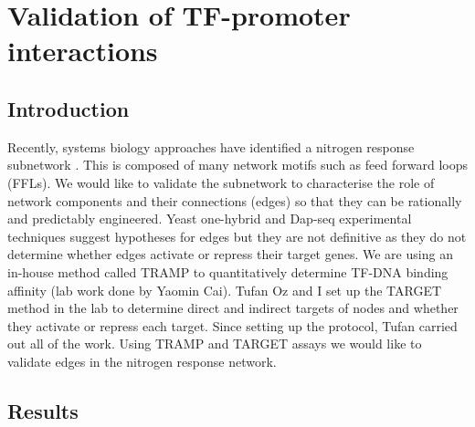 \documentclass[../main.tex]{subfiles}
\begin{document}
\chapter{Validation of TF-promoter interactions}\label{chapter4}
\section{Introduction}\label{chapter4:introduction}
Recently, systems biology approaches have identified a nitrogen response subnetwork \autocite{gaudinierTranscriptionalRegulationNitrogenassociated2018}.
This is composed of many network motifs such as feed forward loops (FFLs).
We would like to validate the subnetwork to characterise the role of network components and their connections (edges) so that they can be rationally and predictably engineered.
Yeast one-hybrid and Dap-seq experimental techniques suggest hypotheses for edges but they are not definitive as they do not determine whether edges activate or repress their target genes.
We are using an in-house method called TRAMP to quantitatively determine TF-DNA binding affinity (lab work done by Yaomin Cai).
Tufan Oz and I set up the TARGET~\autocite{bargmannTARGETTransientTransformation2013} method in the lab to determine direct and indirect targets of nodes and whether they activate or repress each target. Since setting up the protocol, Tufan carried out all of the work.
Using TRAMP and TARGET assays we would like to validate edges in the nitrogen response network.
\section{Results}\label{chapter4:results}
\end{document}
